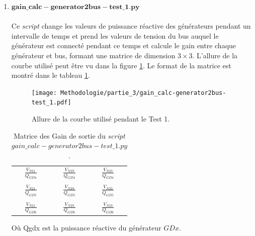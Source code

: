 \begin{enumerate}[\bfseries 4.3.1]
	\item $\mathbf{gain\_calc-generator2bus-test\_1.py}$\\
	\\Ce \textit{script} change les valeurs de puissance réactive des générateurs pendant un intervalle de temps et prend les valeurs de tension du bus auquel le générateur est connecté pendant ce temps et calcule le gain entre chaque générateur et bus, formant une matrice de dimension $ 3\times3 $. L'allure de la courbe utilisé peut être vu dans la figure \ref{fig:gaincalcgenerator2bustest1}. Le format de la matrice est montré dans le tableau \ref{tab:gaincalcgenerator2bustest1}.
	\begin{figure}[H]
		\begin{center}	
			\texttt{[image: Methodologie/partie\_3/gain\_calc-generator2bus-test\_1.pdf]}
			\caption{Allure de la courbe utilisé pendant le Test 1.}
			\label{fig:gaincalcgenerator2bustest1}
		\end{center}
	\end{figure}
\begin{table}[H]
	\captionsetup{justification=centering,margin=2cm}
	\caption{Matrice des Gain de sortie du \textit{script} $gain\_calc-generator2bus-test\_1.py$.}
	\label{tab:gaincalcgenerator2bustest1}
	\centering
	\begin{tabular}{ccc}
		$ \frac{V_{N21}}{Q_{GD4}} $&$ \frac{V_{N29}}{Q_{GD4}} $&$ \frac{V_{N23}}{Q_{GD4}} $\\
		&&\\
		$ \frac{V_{N21}}{Q_{GD5}} $&$ \frac{V_{N29}}{Q_{GD5}} $&$ \frac{V_{N23}}{Q_{GD5}} $\\
		&&\\
		$ \frac{V_{N21}}{Q_{GD6}} $&$ \frac{V_{N29}}{Q_{GD6}} $&$ \frac{V_{N23}}{Q_{GD6}} $\\
	\end{tabular}
\end{table}
Où \gls{Qgdx} est la puissance réactive du générateur $ GDx $.


\end{enumerate}
